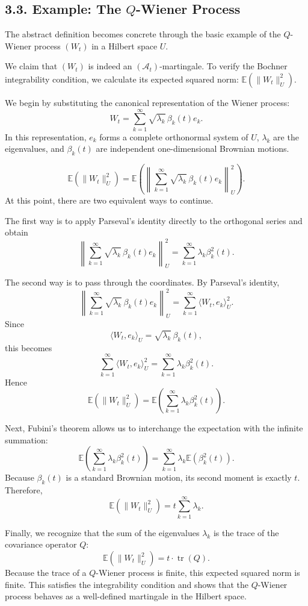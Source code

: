 \documentclass[11pt]{article}
\theoremstyle{definition}
\theoremstyle{remark}
\begin{document}
\subsection*{3.3. Example: The \(Q\)-Wiener Process}
The abstract definition becomes concrete through the basic example of the \(Q\)-Wiener process \((W_t)\) in a Hilbert space \(U\).

We claim that \((W_t)\) is indeed an \((\mathcal A_t)\)-martingale. To verify the Bochner integrability condition, we calculate its expected squared norm:
\(\mathbb E(\|W_t\|_U^2)\).

We begin by substituting the canonical representation of the Wiener process:
\[
W_t=\sum_{k=1}^{\infty}\sqrt{\lambda_k}\,\beta_k(t)e_k.
\]
In this representation, \(e_k\) forms a complete orthonormal system of \(U\), \(\lambda_k\) are the eigenvalues, and \(\beta_k(t)\) are independent one-dimensional Brownian motions.

\[
\mathbb E(\|W_t\|_U^2)
=
\mathbb E\left(\left\|\sum_{k=1}^{\infty}\sqrt{\lambda_k}\,\beta_k(t)e_k\right\|_U^2\right).
\]
At this point, there are two equivalent ways to continue.

The first way is to apply Parseval's identity directly to the orthogonal series and obtain
\[
\left\|\sum_{k=1}^{\infty}\sqrt{\lambda_k}\,\beta_k(t)e_k\right\|_U^2
=
\sum_{k=1}^{\infty}\lambda_k\beta_k^2(t).
\]

The second way is to pass through the coordinates. By Parseval's identity,
\[
\left\|\sum_{k=1}^{\infty}\sqrt{\lambda_k}\,\beta_k(t)e_k\right\|_U^2
=
\sum_{k=1}^{\infty}\langle W_t,e_k\rangle_U^2.
\]
Since
\[
\langle W_t,e_k\rangle_U
=
\sqrt{\lambda_k}\,\beta_k(t),
\]
this becomes
\[
\sum_{k=1}^{\infty}\langle W_t,e_k\rangle_U^2
=
\sum_{k=1}^{\infty}\lambda_k\beta_k^2(t).
\]
Hence
\[
\mathbb E(\|W_t\|_U^2)
=
\mathbb E\left(\sum_{k=1}^{\infty}\lambda_k\beta_k^2(t)\right).
\]

Next, Fubini's theorem allows us to interchange the expectation with the infinite summation:
\[
\mathbb E\left(\sum_{k=1}^{\infty}\lambda_k\beta_k^2(t)\right)
=
\sum_{k=1}^{\infty}\lambda_k \mathbb E(\beta_k^2(t)).
\]
Because \(\beta_k(t)\) is a standard Brownian motion, its second moment is exactly \(t\). Therefore,
\[
\mathbb E(\|W_t\|_U^2)
=
t\sum_{k=1}^{\infty}\lambda_k.
\]

Finally, we recognize that the sum of the eigenvalues \(\lambda_k\) is the trace of the covariance operator \(Q\):
\[
\mathbb E(\|W_t\|_U^2)=t\cdot \operatorname{tr}(Q).
\]
Because the trace of a \(Q\)-Wiener process is finite, this expected squared norm is finite. This satisfies the integrability condition and shows that the \(Q\)-Wiener process behaves as a well-defined martingale in the Hilbert space.
\end{document}
